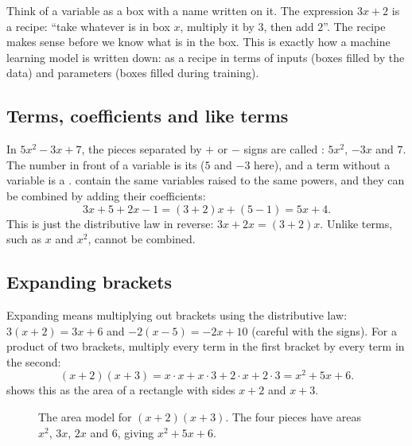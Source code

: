\begin{intuition}
Think of a variable as a box with a name written on it. The expression
$3x + 2$ is a recipe: ``take whatever is in box $x$, multiply it by $3$, then
add $2$''. The recipe makes sense before we know what is in the box. This is
exactly how a machine learning model is written down: as a recipe in terms of
inputs (boxes filled by the data) and parameters (boxes filled during
training).
\end{intuition}

\subsection{Terms, coefficients and like terms}

In $5x^2 - 3x + 7$, the pieces separated by $+$ or $-$ signs are called
: $5x^2$, $-3x$ and $7$. The number in front
of a variable is its  ($5$ and $-3$ here), and a term
without a variable is a .  contain the same
variables raised to the same powers, and they can be combined by adding their
coefficients:
\[
  3x + 5 + 2x - 1 = (3+2)x + (5 - 1) = 5x + 4 .
\]
This is just the distributive law in reverse: $3x + 2x = (3 + 2)x$. Unlike
terms, such as $x$ and $x^2$, cannot be combined.

\subsection{Expanding brackets}

Expanding means multiplying out brackets using the distributive law:
$3(x + 2) = 3x + 6$ and $-2(x - 5) = -2x + 10$ (careful with the signs). For a
product of two brackets, multiply every term in the first bracket by every
term in the second:
\[
  (x + 2)(x + 3) = x\cdot x + x \cdot 3 + 2 \cdot x + 2 \cdot 3
  = x^2 + 5x + 6.
\]
 shows this as the area of a rectangle with sides $x + 2$
and $x + 3$.

\begin{figure}[htbp]
\centering
{}
\caption{The area model for $(x+2)(x+3)$. The four pieces have areas
  $x^2$, $3x$, $2x$ and $6$, giving $x^2 + 5x + 6$.}
\label{fig:area-model}
\end{figure}

